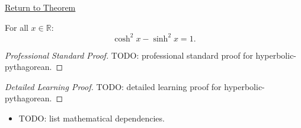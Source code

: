\newpage
{}
\label{prf:hyperbolic-pythagorean}

\begin{remark*}[Return]
\hyperref[prop:hyperbolic-pythagorean]{Return to Theorem}
\end{remark*}

\begin{theorem*}
For all $x \in \mathbb{R}$:
\[
  \cosh^2 x - \sinh^2 x = 1.
\]

\smallskip\noindent
\end{theorem*}

\begin{proof}[Professional Standard Proof]
\LRAProofBodyStart
TODO: professional standard proof for hyperbolic-pythagorean.
\end{proof}

\begin{proof}[Detailed Learning Proof]
\LRAProofBodyStart
TODO: detailed learning proof for hyperbolic-pythagorean.
\end{proof}

\begin{remark*}
\end{remark*}

\begin{dependencies}
\begin{itemize}
  \item TODO: list mathematical dependencies.
\end{itemize}
\end{dependencies}

\clearpage
